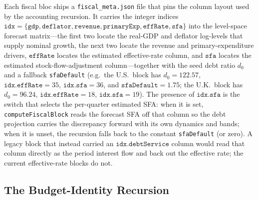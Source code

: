 \documentclass[11pt]{article}
\theoremstyle{definition}
\theoremstyle{remark}
\begin{document}
Each fiscal bloc ships a \texttt{fiscal\_meta.json} file that pins the
column layout used by the accounting recursion.  It carries the integer
indices $\texttt{idx} = \{\texttt{gdp}, \texttt{deflator},
\texttt{revenue}, \texttt{primaryExp}, \texttt{effRate}, \texttt{sfa}\}$
into the level-space forecast matrix---the first two locate the real-GDP and
deflator log-levels that supply nominal growth, the next two locate the
revenue and primary-expenditure drivers, $\texttt{effRate}$ locates the
estimated effective-rate column, and $\texttt{sfa}$ locates the estimated
stock-flow-adjustment column---together with the seed debt ratio $d_0$ and a
fallback \texttt{sfaDefault} (e.g.\ the U.S.\ block has $d_0 = 122.57$,
$\texttt{idx.effRate} = 35$, $\texttt{idx.sfa} = 36$, and
$\texttt{sfaDefault} = 1.75$; the U.K.\ block has $d_0 = 96.24$,
$\texttt{idx.effRate} = 18$, $\texttt{idx.sfa} = 19$). The presence of
$\texttt{idx.sfa}$ is the switch that selects the per-quarter estimated SFA:
when it is set, \texttt{computeFiscalBlock} reads the forecast SFA off that
column so the debt projection carries the discrepancy forward with its own
dynamics and bands; when it is unset, the recursion falls back to the constant
\texttt{sfaDefault} (or zero). A legacy block that instead carried an
$\texttt{idx.debtService}$ column would read that column directly as the period
interest flow and back out the effective rate; the current effective-rate blocks
do not.

\subsection{The Budget-Identity Recursion}\label{sec:fiscal_identity}
\end{document}
